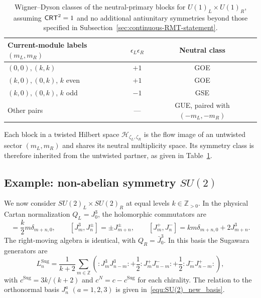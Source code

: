 \documentclass[11pt]{article}
\numberwithin{equation}{section}
\begin{document}
\begin{table}[H]
\centering
\begin{tabular}{lcc}
\toprule
Current-module labels $(m_L,m_R)$ & $\epsilon_L\epsilon_R$ & Neutral class\\
\midrule
$(0,0),(k,k)$ & $+1$ & GOE\\
$(k,0),(0,k)$, $k$ even & $+1$ & GOE\\
$(k,0),(0,k)$, $k$ odd & $-1$ & GSE\\
Other pairs & --- & GUE, paired with $(-m_L,-m_R)$\\
\bottomrule
\end{tabular}
\caption{Wigner--Dyson classes of the neutral-primary blocks for $U(1)_L\times U(1)_R$, assuming $\mathsf{CRT}^2=1$ and no additional antiunitary symmetries beyond those specified in Subsection~\ref{sec:continuous-RMT-statement}.}
\label{table:U1_classes}
\end{table}

Each block in a twisted Hilbert space $\mathcal H_{\zeta_L,\zeta_R}$ is the flow image of an untwisted sector $(m_L,m_R)$ and shares its neutral multiplicity space. Its symmetry class is therefore inherited from the untwisted partner, as given in Table~\ref{table:U1_classes}. 

\subsection{Example: non-abelian symmetry $SU(2)$}
\label{sec:nonabelian-CFT}

We now consider $SU(2)_L\times SU(2)_R$ at equal levels $k\in\mathbb Z_{>0}$. In the physical Cartan normalization $Q_L=J_0^3$, the holomorphic commutators are
\begin{equation}
[J_m^3,J_n^3]=\frac{k}{2}m\delta_{m+n,0},\qquad
 [J_m^3,J_n^\pm]=\pm J_{m+n}^\pm,\qquad
 [J_m^+,J_n^-]=km\delta_{m+n,0}+2J_{m+n}^3.
\end{equation}
The right-moving algebra is identical, with $Q_R=\bar J_0^3$. In this basis the Sugawara generators are
\begin{equation}
L_n^{\mathrm{Sug}}=\frac1{k+2}\sum_{m\in\mathbb Z}
 \left(:J_m^3J_{n-m}^3:
 +\frac12:J_m^+J_{n-m}^-:
 +\frac12:J_m^-J_{n-m}^+:\right),
\label{sug_su(2)}
\end{equation}
with $c^{\mathrm{Sug}}=3k/(k+2)$ and $c^N=c-c^{\mathrm{Sug}}$ for each chirality. The relation to the orthonormal basis $J_n^a$ $(a=1,2,3)$ is given in~\eqref{equ:SU(2)_new_basis}.
\end{document}
